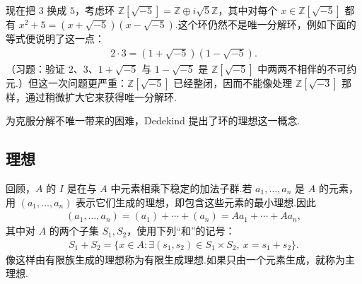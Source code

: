 \begin{example*}[{环 $\mathbb Z[\sqrt{-5}]$ 与方程 $x^2+5=y^3$}]
现在把 $3$ 换成 $5$，考虑环 $\mathbb Z[\sqrt{-5}]=\mathbb Z\oplus i\sqrt5\mathbb Z$，其中对每个 $x\in\mathbb Z[\sqrt{-5}]$ 都有 $x^2+5=(x+\sqrt{-5})(x-\sqrt{-5})$.这个环仍然不是唯一分解环，例如下面的等式便说明了这一点：
\begin{align*}
2\cdot3=(1+\sqrt{-5})(1-\sqrt{-5}).
\end{align*}
（习题：验证 $2$、$3$、$1+\sqrt{-5}$ 与 $1-\sqrt{-5}$ 是 $\mathbb Z[\sqrt{-5}]$ 中两两不相伴的不可约元.）但这一次问题更严重：$\mathbb Z[\sqrt{-5}]$ 已经整闭，因而不能像处理 $\mathbb Z[\sqrt{-3}]$ 那样，通过稍微扩大它来获得唯一分解环.
\end{example*}
为克服分解不唯一带来的困难，Dedekind 提出了环的理想这一概念.

\subsection{理想}\label{sec:galois-1-1-3}
回顾，$A$ 的 $I$ 是在与 $A$ 中元素相乘下稳定的加法子群.若 $a_1,\ldots,a_n$ 是 $A$ 的元素，用 $(a_1,\ldots,a_n)$ 表示它们生成的理想，即包含这些元素的最小理想.因此
\begin{align*}
(a_1,\ldots,a_n)=(a_1)+\cdots+(a_n)=Aa_1+\cdots+Aa_n,
\end{align*}
其中对 $A$ 的两个子集 $S_1,S_2$，使用下列``和''的记号：
\begin{align*}
S_1+S_2=\{x\in A:\exists(s_1,s_2)\in S_1\times S_2,\ x=s_1+s_2\}.
\end{align*}
像这样由有限族生成的理想称为有限生成理想.如果只由一个元素生成，就称为主理想.

